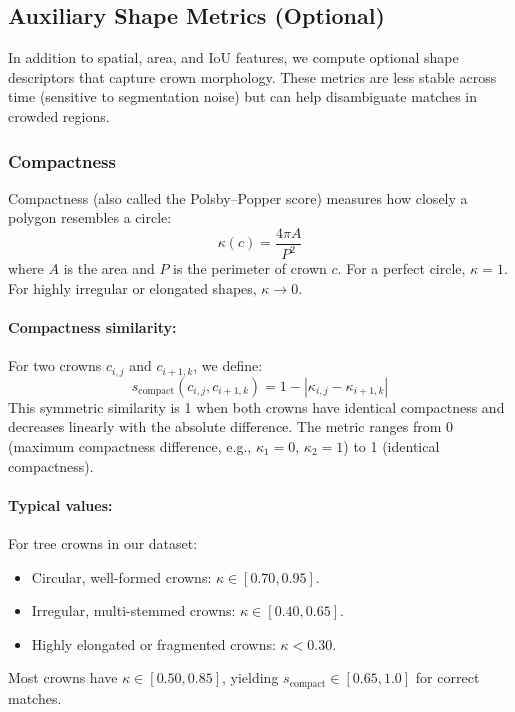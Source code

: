 \subsection{Auxiliary Shape Metrics (Optional)}

In addition to spatial, area, and IoU features, we compute optional shape descriptors that capture crown morphology. These metrics are less stable across time (sensitive to segmentation noise) but can help disambiguate matches in crowded regions.

\subsubsection{Compactness}

Compactness (also called the Polsby--Popper score) measures how closely a polygon resembles a circle:
\[
\kappa(c) = \frac{4\pi A}{P^2}
\]
where $A$ is the area and $P$ is the perimeter of crown $c$. For a perfect circle, $\kappa = 1$. For highly irregular or elongated shapes, $\kappa \to 0$.

\paragraph{Compactness similarity:}
For two crowns $c_{i,j}$ and $c_{i+1,k}$, we define:
\[
s_{\text{compact}}(c_{i,j}, c_{i+1,k}) = 1 - |\kappa_{i,j} - \kappa_{i+1,k}|
\]
This symmetric similarity is 1 when both crowns have identical compactness and decreases linearly with the absolute difference. The metric ranges from 0 (maximum compactness difference, e.g., $\kappa_1 = 0$, $\kappa_2 = 1$) to 1 (identical compactness).

\paragraph{Typical values:}
For tree crowns in our dataset:
\begin{itemize}
    \item Circular, well-formed crowns: $\kappa \in [0.70, 0.95]$.
    \item Irregular, multi-stemmed crowns: $\kappa \in [0.40, 0.65]$.
    \item Highly elongated or fragmented crowns: $\kappa < 0.30$.
\end{itemize}
Most crowns have $\kappa \in [0.50, 0.85]$, yielding $s_{\text{compact}} \in [0.65, 1.0]$ for correct matches.

